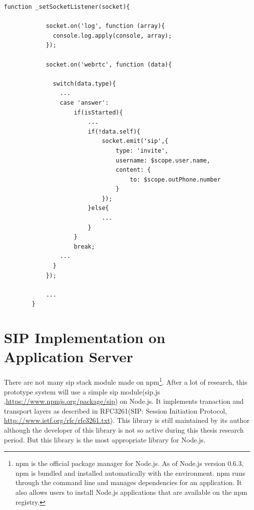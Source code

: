 \begin{lstlisting}[caption={\_setSocketListener() Function in PhoneViewCtrl.js on Application Client},label={code:client_socket}]
function _setSocketListener(socket){

			socket.on('log', function (array){
			  console.log.apply(console, array);
			});

			socket.on('webrtc', function (data){
			  
			  switch(data.type){
			  	...
			  	case 'answer':
			  		if(isStarted){
			  			...
			  			if(!data.self){
			  				socket.emit('sip',{
						    	type: 'invite',
						    	username: $scope.user.name,
						    	content: {
						    		to: $scope.outPhone.number
						    	}
						    });
			  			}else{
			  				...
			  			}
			  		}
			  		break;
			  	...
			  }
			});

			...
		}

\end{lstlisting}


\section{SIP Implementation on Application Server}

\noindent There are not many \gls{sip} stack module made on \gls{npm}\footnote{npm is the official package manager for Node.js. As of Node.js version 0.6.3, npm is bundled and installed automatically with the environment. npm runs through the command line and manages dependencies for an application. It also allows users to install Node.js applications that are available on the npm registry.\cite{wiki:npm}}. After a lot of research, this prototype system will use a simple \gls{sip} module(sip.js ,\url{https://www.npmjs.org/package/sip}) on Node.js. It implements tranaction and transport layers as described in RFC3261(SIP: Session Initiation Protocol, \url{http://www.ietf.org/rfc/rfc3261.txt}). This library is still maintained by its author although the developer of this library is not so active during this thesis research period. But this library is the most appropriate library for Node.js.

